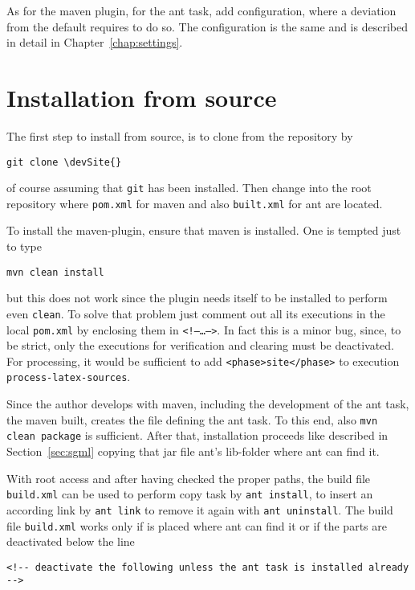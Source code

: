 As for the maven plugin, for the ant task, add configuration, 
where a deviation from the default requires to do so. 
The configuration is the same and is described in detail 
in Chapter~\ref{chap:settings}. 



\section{Installation from source}\label{sec:instSrc}

The first step to install from source, is to clone from the repository by
%
\begin{Verbatim}[commandchars=\\\{\}]
git clone \devSite{}
\end{Verbatim}
%
of course assuming that \texttt{git} has been installed.
Then change into the root repository where \texttt{pom.xml}
for maven and also \texttt{built.xml} for ant are located. 

To install the maven-plugin, ensure that maven is installed. 
One is tempted just to type 
%
\begin{Verbatim}
mvn clean install
\end{Verbatim}
%
but this does not work since the plugin needs itself to be installed
to perform even \texttt{clean}.
To solve that problem just comment out all its executions
in the local \texttt{pom.xml} by enclosing them in \texttt{<!--\ldots-->}.
In fact this is a minor bug, since, to be strict, only
the executions for verification and clearing must be deactivated.
For processing, it would be sufficient to add
\texttt{<phase>site</phase>} to execution \texttt{process-latex-sources}.
\medskip


Since the author develops with maven,
including the development of the ant task,
the maven built, creates the file \createdJar{}
defining the ant task.
To this end, also \texttt{mvn clean package} is sufficient.
After that, installation proceeds like described in Section~\ref{sec:sgml}
copying that jar file ant's lib-folder where ant can find it.

With root access and after having checked the proper paths,
the build file \texttt{build.xml} can be used 
to perform copy task by \texttt{ant install},
to insert an according link by \texttt{ant link}
to remove it again with \texttt{ant uninstall}.
The build file \texttt{build.xml} works only
if \createdJar{} is placed where ant can find it
or if the parts are deactivated below the line
%
\begin{Verbatim}
<!-- deactivate the following unless the ant task is installed already -->
\end{Verbatim}

